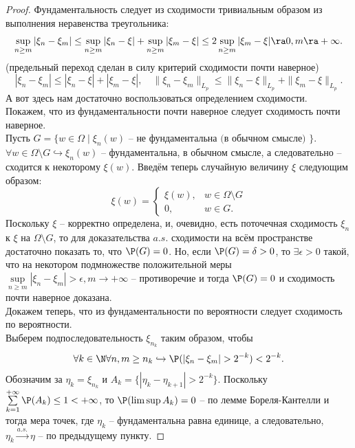 \begin{proof}
    Фундаментальность следует из сходимости тривиальным образом из выполнения неравенства треугольника:
    \[
        \sup\limits_{n \geq m}|\xi_n - \xi_m| \leq  \sup\limits_{n \geq m} |\xi_n - \xi| + \sup\limits_{n \geq m} |\xi_m - \xi| \leq 2\sup\limits_{n \geq m}|\xi_m - \xi| \ra 0, m \ra +\infty.
    \]
    (предельный переход сделан в силу критерий сходимости почти наверное)
    \[
        |\xi_n - \xi_m| \leq |\xi_n - \xi| + |\xi_m - \xi|, \quad \|\xi_n - \xi_m\|_{L_p} \leq \|\xi_n - \xi\|_{L_p} + \|\xi_m - \xi\|_{L_p}.
    \]
    А вот здесь нам достаточно воспользоваться определением сходимости. \\
    Покажем, что из фундаментальности почти наверное следует сходимость почти наверное. \\
    Пусть $G = \{w \in \Omega \mid \xi_{n}(w) \text{ -- не фундаментальна (в обычном смысле) }\}$.
    $\forall w \in \Omega \setminus G \hookrightarrow \xi_n(w)$ -- фундаментальна, в обычном смысле, а следовательно -- сходится к некоторому $\xi(w)$.
    Введём теперь случайную величину $\xi$ следующим образом:
    \[
        \xi(w) =
        \begin{cases}
            \xi(w), & w \in \Omega \setminus G \\
            0, & w \in G.
        \end{cases}
    \]
    Поскольку $\xi$ -- корректно определена, и, очевидно, есть поточечная сходимость $\xi_n$ к $\xi$ на $\Omega \setminus G$, то для доказательства $a.s.$ сходимости на всём пространстве достаточно показать то, что $\P(G) = 0$.
    Но, если $\P(G) = \delta > 0$, то $\exists \epsilon > 0$ такой, что на некотором подмножестве положительной меры $\sup\limits_{n \geq m}|\xi_n - \xi_m| > \epsilon, m \rightarrow +\infty$ -- противоречие и тогда $\P(G) = 0$ и сходимость почти наверное доказана. \\
    Докажем теперь, что из фундаментальности по вероятности следует сходимость по вероятности. \\
    Выберем подпоследовательность $\xi_{n_k}$ таким образом, чтобы
    \[
        \forall k \in \N \forall n, m \geq n_k \hookrightarrow \P(|\xi_n - \xi_m| > 2^{-k}) < 2^{-k}.
    \]
    Обозначим за $\eta_k = \xi_{n_k}$ и $A_{k} = \{|\eta_k - \eta_{k + 1}| > 2^{-k}\}$.
    Поскольку $\sum\limits_{k = 1}^{+\infty} \P(A_k) \leq 1 < +\infty$, то $\P(\limsup A_k) = 0$ -- по лемме Бореля-Кантелли и тогда мера точек, где $\eta_k$ -- фундаментальна равна единице, а следовательно, $\eta_k \xrightarrow{a.s.} \eta$ -- по предыдущему пункту.

\end{proof}
